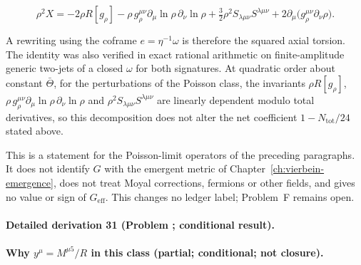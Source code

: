 \[

  \rho^2X=-2\rho R[g_\rho]-\rho\,g_\rho^{\mu\nu}\partial_\mu\ln\rho\,\partial_\nu\ln\rho+\tfrac32\rho^2S_{\lambda\mu\nu}S^{\lambda\mu\nu}+2\partial_\mu\bigl(g_\rho^{\mu\nu}\partial_\nu\rho\bigr).

\]

A rewriting using the coframe \(e=\eta^{-1}\omega\) is therefore the squared axial torsion. The identity was also verified in exact rational arithmetic on finite-amplitude generic two-jets of a closed \(\omega\) for both signatures. At quadratic order about constant \(\bar\Theta\), for the perturbations of the Poisson class, the invariants \(\rho R[g_\rho]\), \(\rho\,g_\rho^{\mu\nu}\partial_\mu\ln\rho\,\partial_\nu\ln\rho\) and \(\rho^2S_{\lambda\mu\nu}S^{\lambda\mu\nu}\) are linearly dependent modulo total derivatives, so this decomposition does not alter the net coefficient \(1-N_{\mathrm{tot}}/24\) stated above.



This is a statement for the Poisson-limit operators of the preceding paragraphs. It does not identify \(G\) with the emergent metric of Chapter~\ref{ch:vierbein-emergence}, does not treat Moyal corrections, fermions or other fields, and gives no value or sign of \(G_{\mathrm{eff}}\). This changes no ledger label; Problem~F remains open.



\paragraph{Detailed derivation 31 (Problem ; conditional result).} \label{ref:detail-30} %



\paragraph{Why \(y^\mu=M^{\mu5}/R\) in this class (partial; conditional; not closure).}

